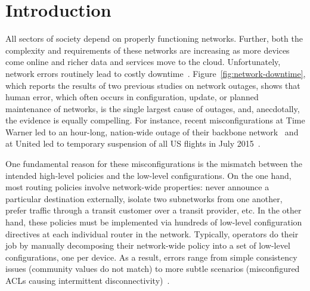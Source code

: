 \section{Introduction}

All sectors of society depend on properly functioning networks.  Further, both the complexity and requirements of these networks are increasing as more devices come online and richer data and services move to the cloud.  Unfortunately, network errors routinely lead to costly downtime~\cite{mahajan+:bgp-misconfiguration,feamster+:rcc,batfish,dc-failure-study}.
Figure~\ref{fig:network-downtime}, which reports the results of two
previous studies on network outages, shows that human error, which often occurs in configuration, update, or planned maintenance of networks, is the single largest cause of outages, and, anecdotally, the evidence is equally compelling.  For instance, recent misconfigurations at
Time Warner led to an hour-long, nation-wide outage of their backbone network~\cite{time-warner} and at United led to temporary suspension of all US flights in July 2015~\cite{united}.

One fundamental reason for these misconfigurations is the
mismatch between the intended high-level
policies and the low-level configurations.  On the one hand, most routing policies involve
network-wide properties:  never announce a particular destination externally, isolate two subnetworks from one another, prefer traffic through a transit customer over a transit provider, etc.
In the other hand, these policies must be implemented via hundreds of low-level configuration directives at each individual router in the network.  Typically, operators do their job by manually
decomposing their network-wide policy into a set of low-level configurations,
one per device.  As a result, errors range from simple consistency issues (community values do not match) to more subtle scenarios (misconfigured ACLs causing intermittent disconnectivity)~\cite{feamster+:rcc,batfish}.


